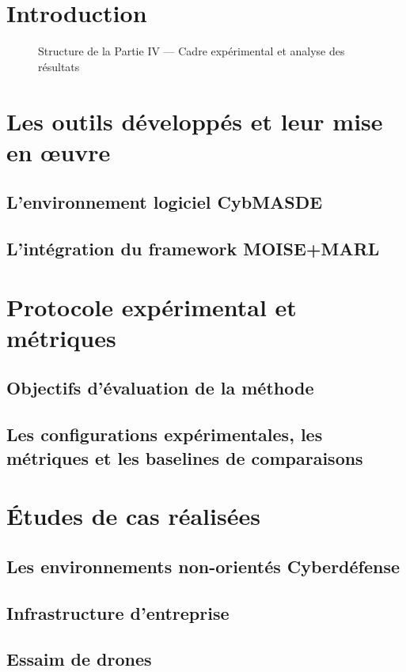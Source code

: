 \documentclass[ twoside,openright,titlepage,numbers=noenddot,headinclude,%
                footinclude=true,cleardoublepage=empty,abstractoff, %
                BCOR=5mm,paper=a4,fontsize=11pt,%
                french,american,%
                ]{scrreprt}
\begin{document}
\chapter*{Introduction}

\begin{figure}[h!]
    \centering
    
    \caption{Structure de la Partie IV — Cadre expérimental et analyse des résultats}
\end{figure}

\chapter{Les outils développés et leur mise en œuvre}
\section{L’environnement logiciel CybMASDE}
\section{L’intégration du framework MOISE+MARL}

\chapter{Protocole expérimental et métriques}
\section{Objectifs d’évaluation de la méthode}
\section{Les configurations expérimentales, les métriques et les baselines de comparaisons}

\chapter{Études de cas réalisées}
\section{Les environnements non-orientés Cyberdéfense}
\section{Infrastructure d'entreprise}
\section{Essaim de drones}
\end{document}
